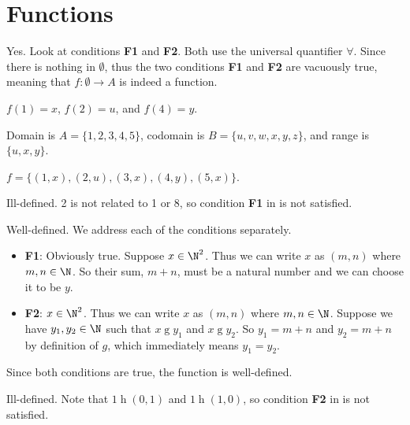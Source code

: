 \section{Functions}
\begin{questions}
    \item Yes. Look at conditions \textbf{F1} and \textbf{F2}. Both use the universal quantifier $\forall$. Since there is nothing in $\emptyset$, thus the two conditions \textbf{F1} and \textbf{F2} are vacuously true, meaning that $f: \emptyset \to A$ is indeed a function.
    
    \item \begin{partquestions}{\alph*}
        \item $f(1) = x$, $f(2) = u$, and $f(4) = y$.
        \item Domain is $A = \{1, 2, 3, 4, 5\}$, codomain is $B = \{u, v, w, x, y, z\}$, and range is $\{u, x, y\}$.
        \item $f = \{(1, x), (2, u), (3, x), (4, y), (5, x)\}$.
    \end{partquestions}

    \item \begin{partquestions}{\alph*}
        \item Ill-defined. 2 is not related to 1 or 8, so condition \textbf{F1} in  is not satisfied.
        \item Well-defined. We address each of the conditions separately.
        \begin{itemize}
            \item \textbf{F1}: Obviously true. Suppose $x \in \N^2$. Thus we can write $x$ as $(m,n)$ where $m, n \in \N$. So their sum, $m + n$, must be a natural number and we can choose it to be $y$.
            \item \textbf{F2}: $x \in \N^2$. Thus we can write $x$ as $(m,n)$ where $m, n \in \N$. Suppose we have $y_1, y_2 \in \N$ such that $x \mathrel{g} y_1$ and $x \mathrel{g} y_2$. So $y_1 = m + n$ and $y_2 = m + n$ by definition of $g$, which immediately means $y_1 = y_2$.
        \end{itemize}
        Since both conditions are true, the function is well-defined.
        \item Ill-defined. Note that $1 \mathrel{h} (0,1)$ and $1 \mathrel{h} (1,0)$, so condition \textbf{F2} in  is not satisfied.
    \end{partquestions}


\end{questions}
